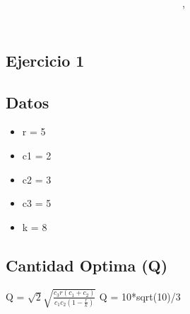 \documentclass{article}
\author{\nombre , \carnet}
\title{\textbf{\Huge\titulo}}
\begin{document}
%

\maketitle
  \begin{Huge}


\section{Ejercicio 1}
\subsection{Datos}
\begin{itemize}
\item r = 5
\item c1 = 2
\item c2 = 3
\item c3 = 5
\item k = 8
\end{itemize}
\subsection{Cantidad Optima (Q)}
Q = $\sqrt{2} \sqrt{\frac{c_{3} r \left(c_{1} + c_{2}\right)}{c_{1} c_{2} \left(1 - \frac{r}{k}\right)}}$
Q = 10*sqrt(10)/3

\end{Huge}
\end{document}
